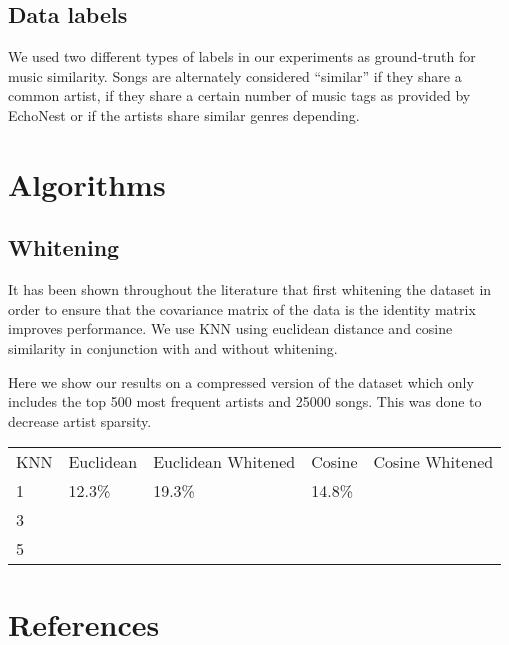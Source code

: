 \documentclass[a4paper,10pt]{article}
\begin{document}
\subsection{Data labels}
We used two different types of labels in our experiments as ground-truth for music similarity. Songs are alternately considered ``similar'' if they share a common artist, if they share a certain number of music tags as provided by EchoNest or if the artists share similar genres depending.
\section{Algorithms}
\subsection{Whitening}
It has been shown throughout the literature that first whitening the dataset in order to ensure that the covariance matrix of the data is the identity matrix improves performance. We use KNN using euclidean distance and cosine similarity in conjunction with and without whitening. 

Here we show our results on a compressed version of the dataset which only includes the top 500 most frequent artists and 25000 songs. This was done to decrease artist sparsity.
\begin{center}
\begin{tabular}{lllll}
KNN & Euclidean & Euclidean Whitened & Cosine & Cosine Whitened\\
1 & 12.3\% & 19.3\% & 14.8\% & \\
3 &  &  &  & \\
5 &  &  &  & 
\end{tabular}
\end{center}


\section{References}
{}
\end{document}
